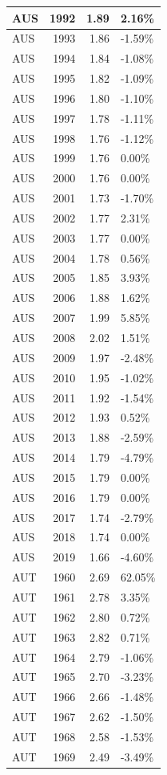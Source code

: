 \documentclass[
]{article}
\begin{document}
\begin{tabular}{l|r|r|l}
\hline
AUS & 1992 & 1.89 & 2.16\%\\
\hline
AUS & 1993 & 1.86 & -1.59\%\\
\hline
AUS & 1994 & 1.84 & -1.08\%\\
\hline
AUS & 1995 & 1.82 & -1.09\%\\
\hline
AUS & 1996 & 1.80 & -1.10\%\\
\hline
AUS & 1997 & 1.78 & -1.11\%\\
\hline
AUS & 1998 & 1.76 & -1.12\%\\
\hline
AUS & 1999 & 1.76 & 0.00\%\\
\hline
AUS & 2000 & 1.76 & 0.00\%\\
\hline
AUS & 2001 & 1.73 & -1.70\%\\
\hline
AUS & 2002 & 1.77 & 2.31\%\\
\hline
AUS & 2003 & 1.77 & 0.00\%\\
\hline
AUS & 2004 & 1.78 & 0.56\%\\
\hline
AUS & 2005 & 1.85 & 3.93\%\\
\hline
AUS & 2006 & 1.88 & 1.62\%\\
\hline
AUS & 2007 & 1.99 & 5.85\%\\
\hline
AUS & 2008 & 2.02 & 1.51\%\\
\hline
AUS & 2009 & 1.97 & -2.48\%\\
\hline
AUS & 2010 & 1.95 & -1.02\%\\
\hline
AUS & 2011 & 1.92 & -1.54\%\\
\hline
AUS & 2012 & 1.93 & 0.52\%\\
\hline
AUS & 2013 & 1.88 & -2.59\%\\
\hline
AUS & 2014 & 1.79 & -4.79\%\\
\hline
AUS & 2015 & 1.79 & 0.00\%\\
\hline
AUS & 2016 & 1.79 & 0.00\%\\
\hline
AUS & 2017 & 1.74 & -2.79\%\\
\hline
AUS & 2018 & 1.74 & 0.00\%\\
\hline
AUS & 2019 & 1.66 & -4.60\%\\
\hline
AUT & 1960 & 2.69 & 62.05\%\\
\hline
AUT & 1961 & 2.78 & 3.35\%\\
\hline
AUT & 1962 & 2.80 & 0.72\%\\
\hline
AUT & 1963 & 2.82 & 0.71\%\\
\hline
AUT & 1964 & 2.79 & -1.06\%\\
\hline
AUT & 1965 & 2.70 & -3.23\%\\
\hline
AUT & 1966 & 2.66 & -1.48\%\\
\hline
AUT & 1967 & 2.62 & -1.50\%\\
\hline
AUT & 1968 & 2.58 & -1.53\%\\
\hline
AUT & 1969 & 2.49 & -3.49\%\\
\hline
\end{tabular}
\end{document}
